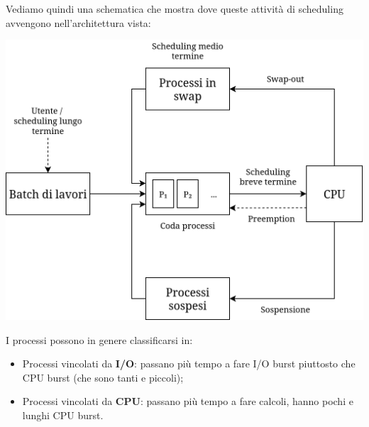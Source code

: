 \documentclass[a4paper,11pt]{article}
\begin{document}
Vediamo quindi una schematica che mostra dove queste attività di scheduling avvengono nell'architettura vista:
\begin{center}
	\includegraphics[scale=0.3]{../figures/scheduling.png}
\end{center}

I processi possono in genere classificarsi in:
\begin{itemize}
	\item Processi vincolati da \textbf{I/O}: passano più tempo a fare I/O burst piuttosto che CPU burst (che sono tanti e piccoli);
	\item Processi vincolati da \textbf{CPU}: passano più tempo a fare calcoli, hanno pochi e lunghi CPU burst.
\end{itemize}
\end{document}
